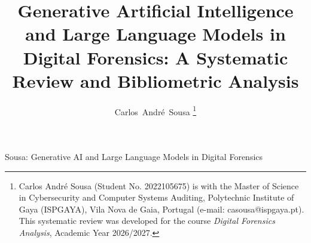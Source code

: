 \documentclass[journal]{IEEEtran}
\begin{document}
\title{Generative Artificial Intelligence and Large Language Models in Digital Forensics: A Systematic Review and Bibliometric Analysis}

\author{Carlos~Andr\'e~Sousa%
\thanks{Carlos Andr\'e Sousa (Student No. 2022105675) is with the Master of Science in Cybersecurity and Computer Systems Auditing, Polytechnic Institute of Gaya (ISPGAYA), Vila Nova de Gaia, Portugal (e-mail: casousa@ispgaya.pt). This systematic review was developed for the course \textit{Digital Forensics Analysis}, Academic Year 2026/2027.}}

%
{Sousa: Generative AI and Large Language Models in Digital Forensics}

\maketitle
\end{document}
